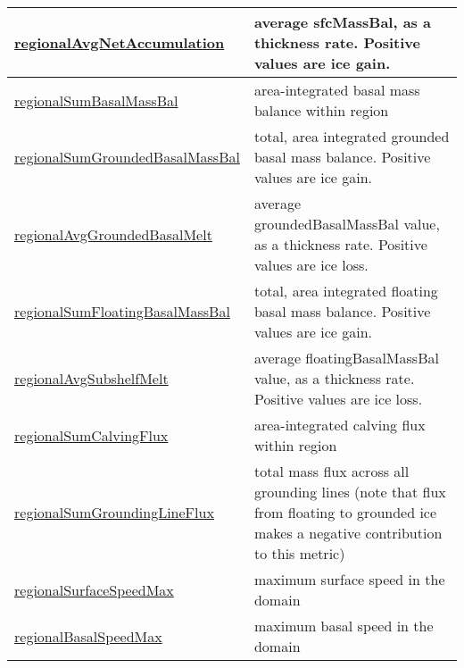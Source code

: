 {\begin{center}
\begin{longtable}{| p{2.0in} | p{4.0in} |}
    \hline
    \hyperref[subsec:var_sec_regionalStatsAM_regionalAvgNetAccumulation]{regionalAvgNetAccumulation} & average sfcMassBal, as a thickness rate. Positive values are ice gain. \\
    \hline
    \hyperref[subsec:var_sec_regionalStatsAM_regionalSumBasalMassBal]{regionalSumBasalMassBal} & area-integrated basal mass balance within region \\
    \hline
    \hyperref[subsec:var_sec_regionalStatsAM_regionalSumGroundedBasalMassBal]{regionalSumGroundedBasalMass\-Bal} & total, area integrated grounded basal mass balance. Positive values are ice gain. \\
    \hline
    \hyperref[subsec:var_sec_regionalStatsAM_regionalAvgGroundedBasalMelt]{regionalAvgGroundedBasalMelt} & average groundedBasalMassBal value, as a thickness rate. Positive values are ice loss. \\
    \hline
    \hyperref[subsec:var_sec_regionalStatsAM_regionalSumFloatingBasalMassBal]{regionalSumFloatingBasalMass\-Bal} & total, area integrated floating basal mass balance. Positive values are ice gain. \\
    \hline
    \hyperref[subsec:var_sec_regionalStatsAM_regionalAvgSubshelfMelt]{regionalAvgSubshelfMelt} & average floatingBasalMassBal value, as a thickness rate. Positive values are ice loss. \\
    \hline
    \hyperref[subsec:var_sec_regionalStatsAM_regionalSumCalvingFlux]{regionalSumCalvingFlux} & area-integrated calving flux within region \\
    \hline
    \hyperref[subsec:var_sec_regionalStatsAM_regionalSumGroundingLineFlux]{regionalSumGroundingLineFlux} & total mass flux across all grounding lines (note that flux from floating to grounded ice makes a negative contribution to this metric) \\
    \hline
    \hyperref[subsec:var_sec_regionalStatsAM_regionalSurfaceSpeedMax]{regionalSurfaceSpeedMax} & maximum surface speed in the domain \\
    \hline
    \hyperref[subsec:var_sec_regionalStatsAM_regionalBasalSpeedMax]{regionalBasalSpeedMax} & maximum basal speed in the domain \\
    \hline
\end{longtable}
\end{center}
}
